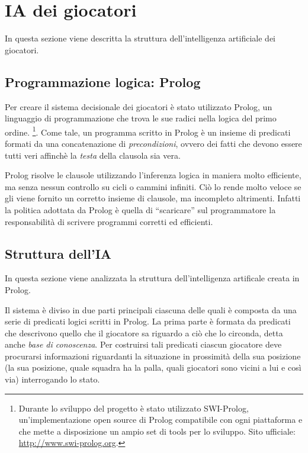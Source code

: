 
\section{IA dei giocatori}
\label{sec:ai_giocatori}

In questa sezione viene descritta la struttura dell'intelligenza artificiale dei giocatori.

\subsection{Programmazione logica: Prolog}
Per creare il sistema decisionale dei giocatori è stato utilizzato Prolog, un linguaggio di programmazione che trova le sue radici nella logica del primo ordine.
\footnote{Durante lo sviluppo del progetto \`{e} stato utilizzato SWI-Prolog, un'implementazione open source di Prolog compatibile con ogni piattaforma e che mette a disposizione un ampio set di tools per lo sviluppo. Sito ufficiale: \href{http://www.swi-prolog.org/}{http://www.swi-prolog.org}.}.
Come tale, un programma scritto in Prolog \`{e} un insieme di predicati formati da una concatenazione di \emph{precondizioni}, ovvero dei fatti che devono essere tutti veri affinch\`{e} la \emph{testa} della clausola sia vera.

Prolog risolve le clausole utilizzando l'inferenza logica in maniera molto efficiente, ma senza nessun controllo su cicli o cammini infiniti. Ci\`{o} lo rende molto veloce se gli viene fornito un corretto insieme di clausole, ma incompleto altrimenti. Infatti la politica adottata da Prolog \`{e} quella di ``scaricare'' sul programmatore la responsabilit\`{a} di scrivere programmi corretti ed efficienti.\\

\subsection{Struttura dell'IA}
\label{sec:struct_ia}
In questa sezione viene analizzata la struttura dell'intelligenza artificale creata in Prolog.

Il sistema \`{e} diviso in due parti principali ciascuna delle quali \`{e} composta da una serie di predicati logici scritti in Prolog. La prima parte \`{e} formata da predicati che descrivono quello che il giocatore sa riguardo a ci\`{o} che lo circonda, detta anche \emph{base di conoscenza}. Per costruirsi tali predicati ciascun giocatore deve procurarsi informazioni riguardanti la situazione in prossimit\`{a} della sua posizione (la sua posizione, quale squadra ha la palla, quali giocatori sono vicini a lui e cos\`{i} via) interrogando lo stato.

